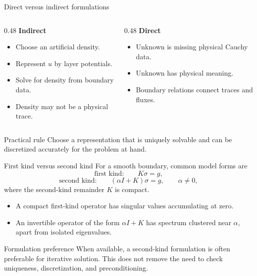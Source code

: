 \documentclass[aspectratio=169,11pt]{beamer}
\begin{document}
\begin{frame}{Direct versus indirect formulations}
\small
\begin{columns}[T,totalwidth=\textwidth]
\begin{column}{0.48\textwidth}
\textbf{Indirect}
\begin{itemize}
  \item Choose an artificial density.
  \item Represent $u$ by layer potentials.
  \item Solve for density from boundary data.
  \item Density may not be a physical trace.
\end{itemize}
\end{column}
\begin{column}{0.48\textwidth}
\textbf{Direct}
\begin{itemize}
  \item Unknown is missing physical Cauchy data.
  \item Unknown has physical meaning.
  \item Boundary relations connect traces and fluxes.
\end{itemize}
\end{column}
\end{columns}

\begin{block}{Practical rule}
Choose a representation that is uniquely solvable and can be discretized
accurately for the problem at hand.
\end{block}
\end{frame}

\begin{frame}{First kind versus second kind}
\small
For a smooth boundary, common model forms are
\[
\text{first kind:}\qquad
K\sigma=g,
\]
\[
\text{second kind:}\qquad
\left(\alpha I+K\right)\sigma=g,\qquad \alpha\ne0,
\]
where the second-kind remainder $K$ is compact.

\begin{itemize}
  \item A compact first-kind operator has singular values accumulating at zero.
  \item An invertible operator of the form $\alpha I+K$ has spectrum clustered
  near $\alpha$, apart from isolated eigenvalues.
\end{itemize}

\begin{block}{Formulation preference}
When available, a second-kind formulation is often preferable for iterative
solution.  This does not remove the need to check uniqueness, discretization,
and preconditioning.
\end{block}
\end{frame}
\end{document}
